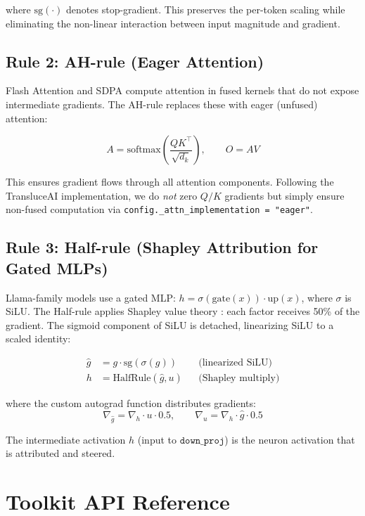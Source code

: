 \documentclass[11pt]{article}
\begin{document}
where $\text{sg}(\cdot)$ denotes stop-gradient.
This preserves the per-token scaling while eliminating the non-linear interaction between input magnitude and gradient.

\subsection{Rule 2: AH-rule (Eager Attention)}

Flash Attention and SDPA compute attention in fused kernels that do not expose intermediate gradients.
The AH-rule replaces these with eager (unfused) attention:

\begin{equation}
    A = \text{softmax}\left(\frac{QK^\top}{\sqrt{d_k}}\right), \qquad O = AV
\end{equation}

This ensures gradient flows through all attention components.
Following the TransluceAI implementation, we do \emph{not} zero $Q/K$ gradients but simply ensure non-fused computation via \texttt{config.\_attn\_implementation = "eager"}.

\subsection{Rule 3: Half-rule (Shapley Attribution for Gated MLPs)}

Llama-family models use a gated MLP: $h = \sigma(\text{gate}(x)) \cdot \text{up}(x)$, where $\sigma$ is SiLU.
The Half-rule applies Shapley value theory \citep{shapley1953value}: each factor receives 50\% of the gradient.
The sigmoid component of SiLU is detached, linearizing SiLU to a scaled identity:

\begin{align}
    \hat{g} &= g \cdot \text{sg}(\sigma(g))  && \text{(linearized SiLU)} \\
    h &= \text{HalfRule}(\hat{g}, u) && \text{(Shapley multiply)}
\end{align}

where the custom autograd function distributes gradients:
\begin{equation}
    \nabla_{\hat{g}} = \nabla_h \cdot u \cdot 0.5, \qquad \nabla_u = \nabla_h \cdot \hat{g} \cdot 0.5
\end{equation}

The intermediate activation $h$ (input to $\texttt{down\_proj}$) is the neuron activation that is attributed and steered.


\section{Toolkit API Reference}
\label{sec:api}
\end{document}

